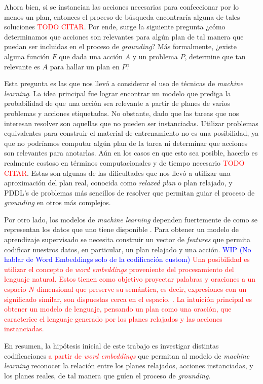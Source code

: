 Ahora bien, si se instancian las acciones necesarias para confeccionar por lo
menos un plan, entonces el proceso de búsqueda encontraría alguna de tales
soluciones \textcolor{red}{TODO CITAR}. Por ende, surge la siguiente pregunta
¿cómo determinamos que acciones son relevantes para algún plan de tal manera que
puedan ser incluidas en el proceso de \emph{grounding}? Más formalmente, ¿existe
alguna función $F$ que dada una acción $A$ y un problema $P$, determine que tan
relevante es $A$ para hallar un plan en $P$?

Esta pregunta es las que nos llevó a considerar el uso de técnicas de
\emph{machine learning}. La idea principal fue lograr encontrar un modelo que
prediga la probabilidad de que una acción sea relevante a partir de planes de
varios problemas y acciones etiquetadas. No obstante, dado que las tareas que
nos interesan resolver son aquellas que no pueden ser instanciadas. Utilizar
problemas equivalentes para construir el material de entrenamiento no es una
posibilidad, ya que no podríamos computar algún plan de la tarea ni determinar
que acciones son relevantes para anotarlas. Aún en los casos en que esto sea
posible, hacerlo es realmente costoso en términos computacionales y de tiempo
necesario \textcolor{red}{TODO CITAR}. Estas son algunas de las dificultades que
nos llevó a utilizar una aproximación del plan real, conocida como \emph{relaxed
plan} o plan relajado, y PDDL's de problemas más sencillos de resolver que
permitan guiar el proceso de \emph{grounding} en otros más complejos.

Por otro lado, los modelos de \emph{machine learning} dependen fuertemente de
como se representan los datos que uno tiene disponible \citep{Heaton-2016-AnEA}.
Para obtener un modelo de aprendizaje supervisado se necesita construir un
vector de \emph{features} que permita codificar nuestros datos, en particular,
un plan relajado y una acción. \textcolor{blue}{WIP (No hablar de Word
Embeddings solo de la codificación custom)} \textcolor{red}{Una posibilidad es
utilizar el concepto de \emph{word embeddings} proveniente del procesamiento del
lenguaje natural. Estos tienen como objetivo proyectar palabras y oraciones a un
espacio $N$ dimensional que preserve su semántica, es decir, expresiones con un
significado similar, son dispuestas cerca en el espacio.
\citep{Mikolov-Ilya-Kai-Greg-Jeffrey-2013,
Pennington-Jeffrey-Socher-Richard-Manning-Christopher-2014,
Bojanowski-Grave-Joulin-Mikolov-2016}. La intuición principal es obtener un
modelo de lenguaje, pensando un plan como una oración, que caracterice el
lenguaje generado por los planes relajados y las acciones instanciadas.}

En resumen, la hipótesis inicial de este trabajo es investigar distintas
codificaciones \textcolor{red}{a partir de \emph{word embeddings}} que permitan
al modelo de \emph{machine learning} reconocer la relación entre los planes
relajados, acciones instanciadas, y los planes reales, de tal manera que guíen
el proceso de \emph{grounding}.
